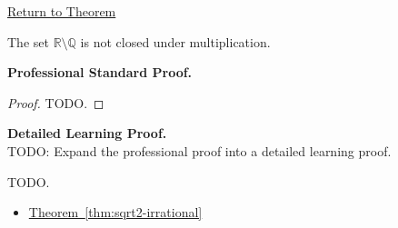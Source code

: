 \newpage
{}
\label{prf:irrationals-not-closed-under-multiplication}

\begin{remark*}[Return]
\hyperref[cor:irrationals-not-closed-under-multiplication]{Return to Theorem}
\end{remark*}

\begin{theorem*}
The set $\mathbb{R}\setminus\mathbb{Q}$ is not closed under multiplication.
\end{theorem*}

\textbf{Professional Standard Proof.}~\\
\begin{proof}
TODO.
\end{proof}

\textbf{Detailed Learning Proof.}~\\
TODO: Expand the professional proof into a detailed learning proof.


\begin{remark*}
TODO.
\end{remark*}

\begin{dependencies}
\begin{itemize}
  \item \hyperref[thm:sqrt2-irrational]{Theorem~\ref*{thm:sqrt2-irrational}}
\end{itemize}
\end{dependencies}

